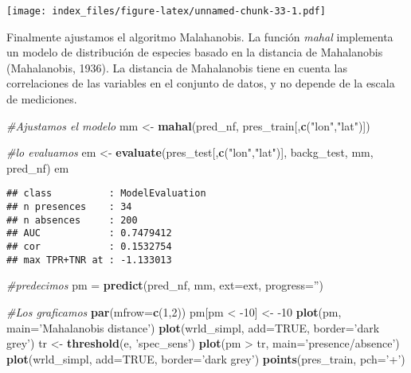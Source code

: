 \documentclass[]{article}
\newenvironment{Shaded}{\begin{snugshade}}{\end{snugshade}}
\newcommand{\KeywordTok}[1]{\textcolor[rgb]{0.13,0.29,0.53}{\textbf{{#1}}}}
\newcommand{\DataTypeTok}[1]{\textcolor[rgb]{0.13,0.29,0.53}{{#1}}}
\newcommand{\DecValTok}[1]{\textcolor[rgb]{0.00,0.00,0.81}{{#1}}}
\newcommand{\StringTok}[1]{\textcolor[rgb]{0.31,0.60,0.02}{{#1}}}
\newcommand{\CommentTok}[1]{\textcolor[rgb]{0.56,0.35,0.01}{\textit{{#1}}}}
\newcommand{\OtherTok}[1]{\textcolor[rgb]{0.56,0.35,0.01}{{#1}}}
\newcommand{\NormalTok}[1]{{#1}}
\begin{document}
\texttt{[image: index\_files/figure-latex/unnamed-chunk-33-1.pdf]}

Finalmente ajustamos el algoritmo Malahanobis. La función \emph{mahal}
implementa un modelo de distribución de especies basado en la distancia
de Mahalanobis (Mahalanobis, 1936). La distancia de Mahalanobis tiene en
cuenta las correlaciones de las variables en el conjunto de datos, y no
depende de la escala de mediciones.

\begin{Shaded}
\begin{Highlighting}[]
\CommentTok{#Ajustamos el modelo}
\NormalTok{mm <-}\StringTok{ }\KeywordTok{mahal}\NormalTok{(pred_nf, pres_train[,}\KeywordTok{c}\NormalTok{(}\StringTok{"lon"}\NormalTok{,}\StringTok{"lat"}\NormalTok{)])}

\CommentTok{#lo evaluamos}
\NormalTok{em <-}\StringTok{ }\KeywordTok{evaluate}\NormalTok{(pres_test[,}\KeywordTok{c}\NormalTok{(}\StringTok{"lon"}\NormalTok{,}\StringTok{"lat"}\NormalTok{)], backg_test, mm, pred_nf)}
\NormalTok{em}
\end{Highlighting}
\end{Shaded}

\begin{verbatim}
## class          : ModelEvaluation 
## n presences    : 34 
## n absences     : 200 
## AUC            : 0.7479412 
## cor            : 0.1532754 
## max TPR+TNR at : -1.133013
\end{verbatim}

\begin{Shaded}
\begin{Highlighting}[]
\CommentTok{#predecimos}
\NormalTok{pm =}\StringTok{ }\KeywordTok{predict}\NormalTok{(pred_nf, mm, }\DataTypeTok{ext=}\NormalTok{ext, }\DataTypeTok{progress=}\StringTok{''}\NormalTok{)}

\CommentTok{#Los graficamos}
\KeywordTok{par}\NormalTok{(}\DataTypeTok{mfrow=}\KeywordTok{c}\NormalTok{(}\DecValTok{1}\NormalTok{,}\DecValTok{2}\NormalTok{))}
\NormalTok{pm[pm <}\StringTok{ }\NormalTok{-}\DecValTok{10}\NormalTok{] <-}\StringTok{ }\NormalTok{-}\DecValTok{10}
\KeywordTok{plot}\NormalTok{(pm, }\DataTypeTok{main=}\StringTok{'Mahalanobis distance'}\NormalTok{)}
\KeywordTok{plot}\NormalTok{(wrld_simpl, }\DataTypeTok{add=}\OtherTok{TRUE}\NormalTok{, }\DataTypeTok{border=}\StringTok{'dark grey'}\NormalTok{)}
\NormalTok{tr <-}\StringTok{ }\KeywordTok{threshold}\NormalTok{(e, }\StringTok{'spec_sens'}\NormalTok{)}
\KeywordTok{plot}\NormalTok{(pm >}\StringTok{ }\NormalTok{tr, }\DataTypeTok{main=}\StringTok{'presence/absence'}\NormalTok{)}
\KeywordTok{plot}\NormalTok{(wrld_simpl, }\DataTypeTok{add=}\OtherTok{TRUE}\NormalTok{, }\DataTypeTok{border=}\StringTok{'dark grey'}\NormalTok{)}
\KeywordTok{points}\NormalTok{(pres_train, }\DataTypeTok{pch=}\StringTok{'+'}\NormalTok{)}
\end{Highlighting}
\end{Shaded}
\end{document}
